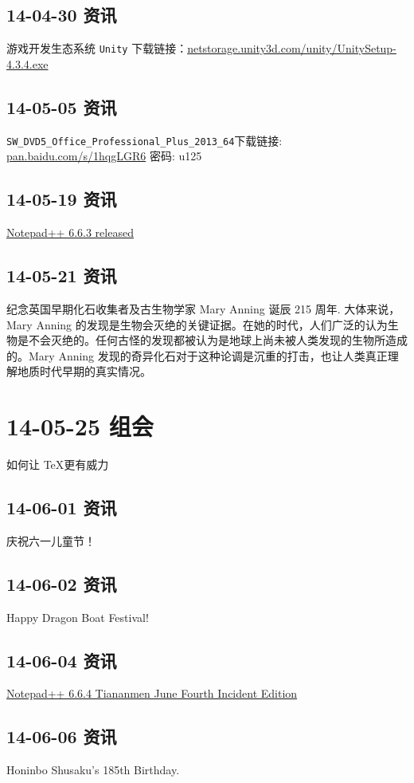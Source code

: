 \documentclass[]{report}
\begin{document}
	\subsection{14-04-30 资讯}
		游戏开发生态系统 \verb|Unity| 下载链接：\href{http://netstorage.unity3d.com/unity/UnitySetup-4.3.4.exe}{netstorage.unity3d.com/unity/UnitySetup-4.3.4.exe}
	\subsection{14-05-05 资讯}
		\verb|SW_DVD5_Office_Professional_Plus_2013_64|下载链接: \href{http://pan.baidu.com/s/1hqgLGR6}{pan.baidu.com/s/1hqgLGR6} 密码: u125
	\subsection{14-05-19 资讯}
		\href{http://notepad-plus-plus.org/zh/download/v6.6.3.html}{Notepad++ 6.6.3 released}
	\subsection{14-05-21 资讯}
		纪念英国早期化石收集者及古生物学家 Mary Anning 诞辰 215 周年.
		大体来说，Mary Anning 的发现是生物会灭绝的关键证据。在她的时代，人们广泛的认为生物是不会灭绝的。任何古怪的发现都被认为是地球上尚未被人类发现的生物所造成的。Mary Anning 发现的奇异化石对于这种论调是沉重的打击，也让人类真正理解地质时代早期的真实情况。
\section{14-05-25 组会}
	如何让 \TeX 更有威力
	\subsection{14-06-01 资讯}
		庆祝六一儿童节！
	\subsection{14-06-02 资讯}
		Happy Dragon Boat Festival!
	\subsection{14-06-04 资讯}
		\href{http://notepad-plus-plus.org/zh/download/v6.6.4.html}{Notepad++ 6.6.4 Tiananmen June Fourth Incident Edition}
	\subsection{14-06-06 资讯}
		Honinbo Shusaku's 185th Birthday.
\end{document}
